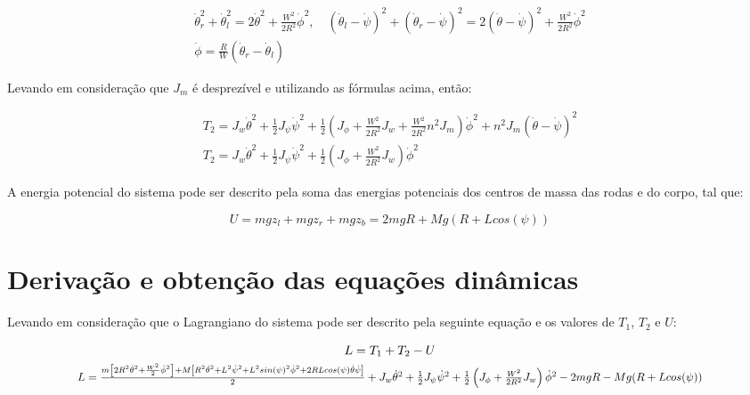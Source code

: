 \documentclass[10pt]{article}
\begin{document}
\begin{equation}
\begin{gathered}
    \dot{\theta}_r^2 + \dot{\theta}_l^2 = 2\dot\theta^2 + \frac{W^2}{2R^2}\dot\phi^2, \quad (\dot{\theta}_l - \dot{\psi})^2 + (\dot{\theta}_r - \dot{\psi})^2 = 2(\dot\theta -\dot\psi)^2 + \frac{W^2}{2R^2}\dot\phi^2 \\
    \dot\phi =\frac{R}{W}\left(\dot\theta_r - \dot\theta_l\right)
\end{gathered}
\end{equation}

\quad Levando em consideração que $J_m$ é desprezível e utilizando as fórmulas acima, então:

\begin{equation}
\begin{gathered}
    T_2 = J_w \dot{\theta}^2 + \frac{1}{2} J_{\psi} \dot{\psi}^2 + \frac{1}{2} \left( J_{\phi} + \frac{W^2}{2R^2} J_w + \frac{W^2}{2R^2} n^2 J_m \right) \dot{\phi}^2 + n^2 J_m (\dot{\theta} - \dot{\psi})^2 \\
    T_2 = J_w \dot{\theta}^2 + \frac{1}{2} J_{\psi} \dot{\psi}^2 + \frac{1}{2} \left( J_{\phi} + \frac{W^2}{2R^2} J_w \right) \dot{\phi}^2
\end{gathered}
\end{equation}

\quad A energia potencial do sistema pode ser descrito pela soma das energias potenciais dos centros de massa das rodas e do corpo, tal que:

\begin{equation}
    U = mgz_l + mgz_r + mgz_b = 2mgR + Mg(R + Lcos(\psi))
\end{equation}

\section{Derivação e obtenção das equações dinâmicas}

\quad Levando em consideração que o Lagrangiano do sistema pode ser descrito pela seguinte equação e os valores de $T_1$, $T_2$ e $U$:

\begin{equation}
\begin{gathered}
    L = T_1 + T_2 - U  \\
    \scalebox{0.9}{$
    L = \frac{m \left[2R^2\dot{\theta}^2 + \frac{W^2}{2}\dot{\phi}^2\right] + M \left[ R^2 \dot{\theta}^2 + L^2\dot{\psi}^2 + L^2 sin(\psi)^2 \dot{\phi}^2 + 2RL cos(\psi)\dot{\theta}\dot{\psi}\right]}{2}
    + J_w \dot{\theta}^2 + \frac{1}{2} J_{\psi} \dot{\psi}^2 + \frac{1}{2} \left( J_{\phi} + \frac{W^2}{2R^2} J_w \right) \dot{\phi}^2
    - 2mgR - Mg(R + Lcos(\psi))
    $}
\end{gathered}
\end{equation}
\end{document}
